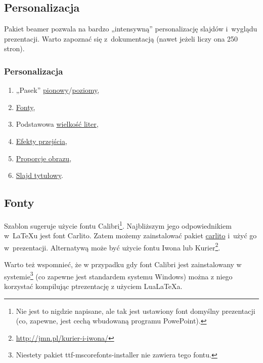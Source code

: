 \documentclass[12pt,aspectratio=169,ignorenonframetext]{beamer}
\begin{document}
\subsection{Personalizacja}

Pakiet beamer pozwala na bardzo „intensywną” personalizację slajdów i~wyglądu prezentacji. Warto zapoznać się z~dokumentacją \cite{Beamer} (nawet jeżeli liczy ona 250 stron).

\begin{frame}
 \frametitle<presentation>{Personalizacja}
 \begin{enumerate}
  \item
        „Pasek” \hyperlink{pasekpionowy}{pionowy}/\hyperlink{pasekpoziomy}{poziomy},
  \item
        \hyperlink{fonty}{Fonty},
  \item
        Podstawowa \hyperlink{fontsize}{wielkość liter},
  \item
        \hyperlink{efekty}{Efekty przejścia},
  \item
        \hyperlink{proporcje}{Proporcje obrazu},
  \item
        \hyperlink{tytul}{Slajd tytułowy}.
 \end{enumerate}
\end{frame}

\subsection{Fonty}\label{lab:fonty}

Szablon sugeruje użycie fontu Calibri\footnote{Nie jest to nigdzie napisane, ale tak jest ustawiony font domyślny prezentacji (co, zapewne, jest cechą wbudowaną programu PowePoint).}. Najbliższym jego odpowiednikiem w~\LaTeX{}u jest font Carlito.
Zatem możemy zainstalować pakiet \href{https://www.ctan.org/pkg/carlito}{carlito} i~użyć go w~prezentacji.
Alternatywą może być użycie fontu Iwona lub Kurier\footnote{\url{http://jmn.pl/kurier-i-iwona/}}.

Warto też wspomnieć, że w przypadku gdy font Calibri jest zainstalowany w systemie\footnote{Niestety pakiet ttf-mscorefonts-installer nie zawiera tego fontu.} (co zapewne jest standardem systemu Windows) można z niego korzystać kompilując ptrezentację z użyciem LuaLaTeXa.
\end{document}
